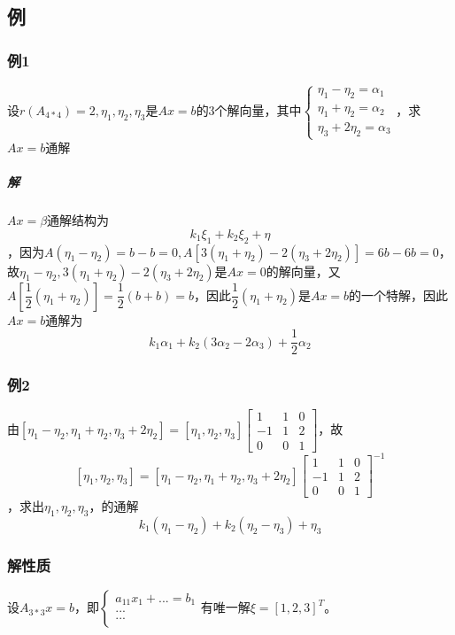 \subsection{例}

\subsubsection{例1}
设\(r(A_{4 * 4}) = 2, \eta_1, \eta_2, \eta_3\)是\(Ax = b\)的3个解向量，其中\(\begin{cases}
\eta_1 - \eta_2 = \alpha_1 \\ 
\eta_1 + \eta_2 = \alpha_2 \\ 
\eta_3 + 2\eta_2 = \alpha_3
\end{cases}\)，求\(Ax = b\)通解

\subparagraph{解}
\(Ax = \beta\)通解结构为\[k_1\xi_1 + k_2\xi_2 + \eta\]，因为\(A(\eta_1 - \eta_2) = b - b = 0, A[3(\eta_1 + \eta_2) - 2(\eta_3 + 2\eta_2)] = 6b - 6b = 0\)，故\(\eta_1 - \eta_2, 3(\eta_1 + \eta_2) - 2(\eta_3 + 2\eta_2)\)是\(Ax = 0\)的解向量，又\(A[\dfrac{1}{2}(\eta_1 + \eta_2)] = \dfrac{1}{2}(b + b) = b\)，因此\(\dfrac{1}{2}(\eta_1 + \eta_2)\)是\(Ax = b\)的一个特解，因此\(Ax = b\)通解为\[k_1\alpha_1 + k_2(3\alpha_2 - 2\alpha_3) + \dfrac{1}{2}\alpha_2\]

\subsubsection{例2}
由\([\eta_1 - \eta_2, \eta_1 + \eta_2, \eta_3 + 2\eta_2] = [\eta_1, \eta_2, \eta_3]\begin{bmatrix}
1 & 1 & 0 \\ 
-1 & 1 & 2 \\ 
0 & 0 & 1
\end{bmatrix}\)，故\[[\eta_1, \eta_2, \eta_3] = [\eta_1 - \eta_2, \eta_1 + \eta_2, \eta_3 + 2\eta_2]\begin{bmatrix}
1 & 1 & 0 \\ 
-1 & 1 & 2 \\ 
0 & 0 & 1
\end{bmatrix}^{-1}\]，求出\(\eta_1, \eta_2, \eta_3\)，的通解\[k_1(\eta_1 - \eta_2) + k_2(\eta_2 - \eta_3) + \eta_3\]


\subsubsection{解性质}
设\(A_{3 * 3}x = b\)，即\(\begin{cases}
    a_{11}x_1 + ... = b_1 \\ 
    ... \\ 
    ... \\ 
\end{cases}\)有唯一解\(\xi = [1, 2, 3]^T\)。

